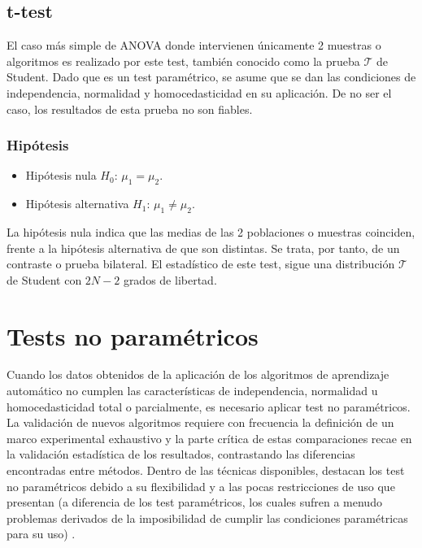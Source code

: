 
\subsection{t-test}
El caso más simple de ANOVA donde intervienen únicamente 2 muestras o algoritmos es realizado por este test, también
conocido como la prueba $\mathcal{T}$ de Student. Dado que es un test paramétrico, se asume que se dan las condiciones
de independencia, normalidad y homocedasticidad en su aplicación. De no ser el caso, los resultados de esta prueba no
son fiables.

\subsubsection{Hipótesis}
\begin{itemize}
\item Hipótesis nula $H_0$: $\mu_1 = \mu_2$.
\item Hipótesis alternativa $H_1$: $\mu_1 \neq \mu_2$.
\end{itemize}
La hipótesis nula indica que las medias de las 2 poblaciones o muestras coinciden, frente a la hipótesis alternativa
de que son distintas. Se trata, por tanto, de un contraste o prueba bilateral. El estadístico de este test, sigue una distribución $\mathcal{T}$ de Student con $2N-2$ grados de libertad.



\section{Tests no paramétricos} \label{no_parametricos}
Cuando los datos obtenidos de la aplicación de los algoritmos de aprendizaje automático no cumplen las
características de independencia, normalidad u homocedasticidad total o parcialmente,  es necesario aplicar
test no paramétricos. La validación de nuevos algoritmos requiere con frecuencia la definición de un marco
experimental exhaustivo y la parte crítica de estas comparaciones recae en la validación estadística de los
resultados, contrastando las diferencias encontradas entre métodos. Dentro de las técnicas disponibles, destacan
los test no paramétricos debido a su flexibilidad y a las pocas restricciones de uso que presentan (a diferencia
de los test paramétricos, los cuales sufren a menudo problemas derivados de la imposibilidad de cumplir las
condiciones paramétricas para su uso) \cite{no_parametricos}.

